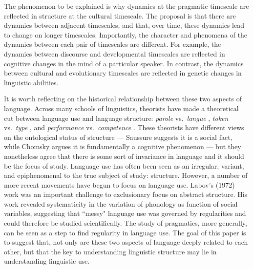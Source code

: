 The phenomenon to be explained is why dynamics at the pragmatic timescale are reflected in structure at the cultural timescale. The proposal is that there are dynamics between adjacent timescales, and that, over time, these dynamics lead to change on longer timescales. Importantly, the character and phenomena of the dynamics between each pair of timescales are different. For example,  the dynamics between discourse and developmental timescales are reflected in cognitive changes in the mind of a particular speaker. In contrast, the dynamics between cultural and evolutionary timescales are reflected in genetic changes in linguistic abilities.

It is worth reflecting on the historical relationship between these two aspects of language. Across many schools of linguistics, theorists have made a theoretical cut between language use and language structure: {\it parole} vs.\  {\it langue}  \cite{saussure},  {\it token}  vs.\  {\it type}  \cite{peirce}, and  {\it performance}  vs.\  {\it competence}  \cite{chomsky1965aspects}. These theorists  have different views on the ontological status of structure --- Saussure suggests it is a social fact, while Chomsky argues it is fundamentally a cognitive phenomenon --- but they nonetheless agree that there is some sort of invariance in language and it should be the focus of study. Language use has often been seen as an irregular, variant, and epiphenomenal to the true subject of study: structure. However, a number of more recent movements have begun to focus on language use. \nocite{labov197213} Labov's (1972) work was an important challenge to exclusionary focus on abstract structure. His work revealed systematicity in the variation of phonology as function of social variables, suggesting that ``messy" language use was governed by regularities and could therefore be studied scientifically. The study of pragmatics, more generally, can be seen as a step to find regularity in language use. The goal of this paper is to suggest that, not only are these two aspects of language deeply related to each other, but that the key to understanding linguistic structure may lie in understanding linguistic use.

